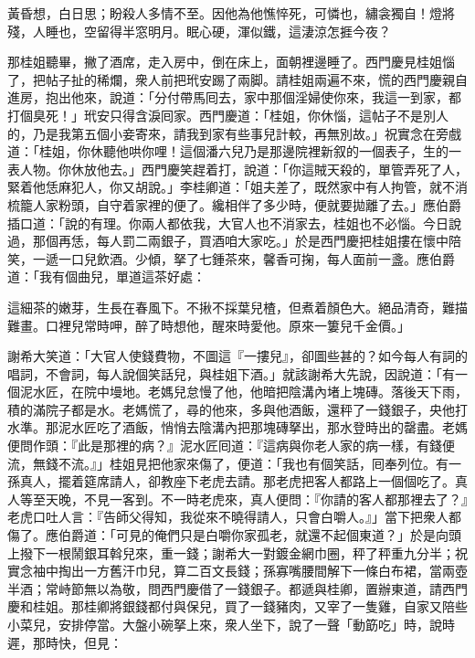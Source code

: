 \begin{myquote}[\markfont]
黃昏想，白日思；盼殺人多情不至。因他為他憔悴死，可憐也，繡衾獨自！燈將殘，人睡也，空留得半窓明月。眠心硬，渾似鐵，這淒涼怎捱今夜？

\end{myquote}

那桂姐聽畢，撇了酒席，走入房中，倒在床上，面朝裡邊睡了。{}西門慶見桂姐惱了，把帖子扯的稀爛，衆人前把玳安踢了兩脚。{}請桂姐兩遍不來，慌的西門慶親自進房，抱出他來，說道：「分付帶馬囘去，家中那個淫婦使你來，我這一到家，都打個臭死！」玳安只得含淚囘家。西門慶道：「桂姐，你休惱，這帖子不是別人的，乃是我第五個小妾寄來，請我到家有些事兒計較，再無別故。」祝實念在旁戲道：「桂姐，你休聽他哄你哩！這個潘六兒乃是那邊院裡新叙的一個表子，生的一表人物。你休放他去。」西門慶笑趕着打，說道：「你這賊天殺的，單管弄死了人，緊着他恁麻犯人，你又胡說。」{}李桂卿道：「姐夫差了，既然家中有人拘管，就不消梳籠人家粉頭，自守着家裡的便了。{}纔相伴了多少時，便就要拋離了去。」{}應伯爵插口道：「說的有理。你兩人都依我，大官人也不消家去，桂姐也不必惱。今日說過，那個再恁，每人罰二兩銀子，買酒咱大家吃。」於是西門慶把桂姐摟在懷中陪笑，一遞一口兒飲酒。少傾，拏了七鍾茶來，馨香可掬，每人面前一盞。應伯爵道：「我有個曲兒，單道這茶好處：

\begin{myquote}
這細茶的嫩芽，生長在春風下。不揪不採葉兒楂，但煮着顏色大。絕品清奇，難描難畫。口裡兒常時呷，醉了時想他，醒來時愛他。{}原來一簍兒千金價。」
\end{myquote}

謝希大笑道：「大官人使錢費物，不圖這『一摟兒』，{}卻圖些甚的？如今每人有詞的唱詞，不會詞，每人說個笑話兒，與桂姐下酒。」就該謝希大先說，因說道：「有一個泥水匠，在院中墁地。老媽兒怠慢了他，他暗把陰溝內堵上塊磚。落後天下雨，積的滿院子都是水。老媽慌了，尋的他來，多與他酒飯，還秤了一錢銀子，央他打水準。那泥水匠吃了酒飯，悄悄去陰溝內把那塊磚拏出，那水登時出的罄盡。老媽便問作頭：『此是那裡的病？』泥水匠囘道：『這病與你老人家的病一樣，有錢便流，無錢不流。』」桂姐見把他家來傷了，便道：「我也有個笑話，囘奉列位。有一孫真人，擺着筵席請人，卻教座下老虎去請。那老虎把客人都路上一個個吃了。真人等至天晚，不見一客到。不一時老虎來，真人便問：『你請的客人都那裡去了？』老虎口吐人言：{}『告師父得知，我從來不曉得請人，只會白嚼人。』」當下把衆人都傷了。應伯爵道：「可見的俺們只是白嚼你家孤老，就還不起個東道？」於是向頭上撥下一根鬧銀耳斡兒來，重一錢；謝希大一對鍍金網巾圈，秤了秤重九分半；祝實念袖中掏出一方舊汗巾兒，算二百文長錢；{}孫寡嘴腰間解下一條白布裙，{}當兩壺半酒；常峙節無以為敬，問西門慶借了一錢銀子。都遞與桂卿，置辦東道，請西門慶和桂姐。那桂卿將銀錢都付與保兒，買了一錢豬肉，又宰了一隻雞，自家又陪些小菜兒，{}安排停當。大盤小碗拏上來，衆人坐下，說了一聲「動筯吃」時，說時遲，那時快，但見：

